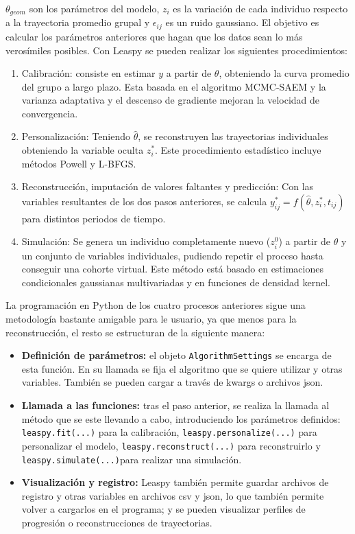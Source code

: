 \documentclass[12pt]{article}
\begin{document}
$\theta_{geom}$ son los parámetros del modelo, $z_{i}$ es la variación de cada individuo respecto a la trayectoria promedio grupal y $\epsilon_{ij}$ es un ruido gaussiano. El objetivo es calcular los parámetros anteriores que hagan que los datos sean lo más verosímiles posibles. Con Leaspy se pueden realizar los siguientes procedimientos:
\begin{enumerate}
	\item Calibración: consiste en estimar $y$ a partir de $\theta$, obteniendo la curva promedio del grupo a largo plazo. Esta basada en el algoritmo MCMC-SAEM y la varianza adaptativa y el descenso de gradiente mejoran la velocidad de convergencia.
	\item Personalización: Teniendo $\hat{\theta}$, se reconstruyen las trayectorias individuales obteniendo la variable oculta $z_{i}^{*}$. Este procedimiento estadístico incluye métodos Powell y L-BFGS.
	\item Reconstrucción, imputación de valores faltantes y predicción: Con las variables resultantes de los dos pasos anteriores, se calcula $y_{ij}^{*}=f(\hat{\theta}, z_{i}^{*}, t_{ij})$ para distintos periodos de tiempo.
	\item Simulación: Se genera un individuo completamente nuevo ($z_{i}^{0}$) a partir de $\hat{\theta}$ y un conjunto de variables individuales, pudiendo repetir el proceso hasta conseguir una cohorte virtual. Este método está basado en estimaciones condicionales gaussianas multivariadas y en funciones de densidad kernel.	
\end{enumerate}

La programación en Python de los cuatro procesos anteriores sigue una metodología bastante amigable para le usuario, ya que menos para la reconstrucción, el resto se estructuran de la siguiente manera:
\begin{itemize}
	\item \textbf{Definición de parámetros:} el objeto \texttt{AlgorithmSettings} se encarga de esta función. En su llamada se fija el algoritmo que se quiere utilizar y otras variables. También se pueden cargar a través de kwargs o archivos json.
	\item \textbf{Llamada a las funciones:} tras el paso anterior, se realiza la llamada al método que se este llevando a cabo, introduciendo los parámetros definidos: \texttt{leaspy.fit(...)} para la calibración, \texttt{leaspy.personalize(...)} para personalizar el modelo, \texttt{leaspy.reconstruct(...)} para reconstruirlo y \texttt{leaspy.simulate(...)}para realizar una simulación.
	\item \textbf{Visualización y registro:} Leaspy también permite guardar archivos de registro y otras variables en archivos csv y json, lo que también permite volver a cargarlos en el programa; y se pueden visualizar perfiles de progresión o reconstrucciones de trayectorias.
\end{itemize}
\end{document}
